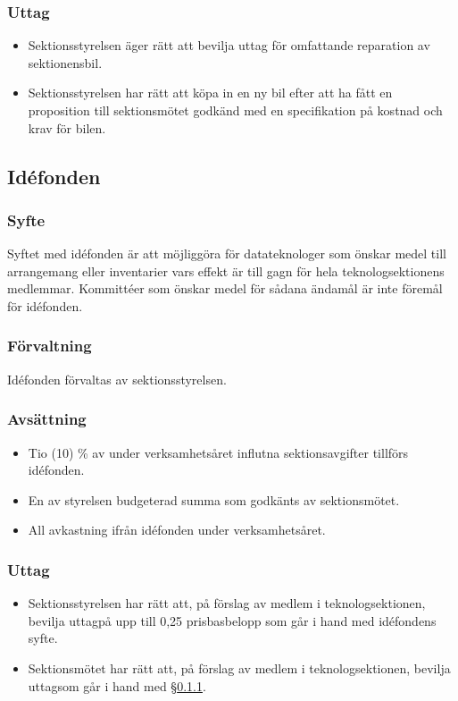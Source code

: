 \documentclass[a4paper, 10pt]{article}
\begin{document}
\subsubsection{Uttag}
\begin{itemize}
    \item Sektionsstyrelsen äger rätt att bevilja uttag för omfattande reparation av sektionensbil.
    \item Sektionsstyrelsen har rätt att köpa in en ny bil efter att ha fått en proposition till sektionsmötet godkänd med en specifikation på kostnad och krav för bilen.
\end{itemize}

\subsection{Idéfonden}
\subsubsection{Syfte}
\label{sec:idefond_syfte}
Syftet med idéfonden är att möjliggöra för datateknologer som önskar medel till arrangemang eller inventarier vars effekt är till gagn för hela teknologsektionens medlemmar. Kommittéer som önskar medel för sådana ändamål är inte föremål för idéfonden.
\subsubsection{Förvaltning}
Idéfonden förvaltas av sektionsstyrelsen.
\subsubsection{Avsättning}
\begin{itemize}
\item Tio (10) \% av under verksamhetsåret influtna sektionsavgifter tillförs idéfonden.
\item En av styrelsen budgeterad summa som godkänts av sektionsmötet.
\item All avkastning ifrån idéfonden under verksamhetsåret.
\end{itemize}
\subsubsection{Uttag}
\begin{itemize}
  \item Sektionsstyrelsen har rätt att, på förslag av medlem i teknologsektionen, bevilja uttagpå upp till 0,25 prisbasbelopp som går i hand med idéfondens syfte.
  \item Sektionsmötet har rätt att, på förslag av medlem i teknologsektionen, bevilja uttagsom går i hand med \S\ref{sec:idefond_syfte}.
\end{itemize}
\end{document}
